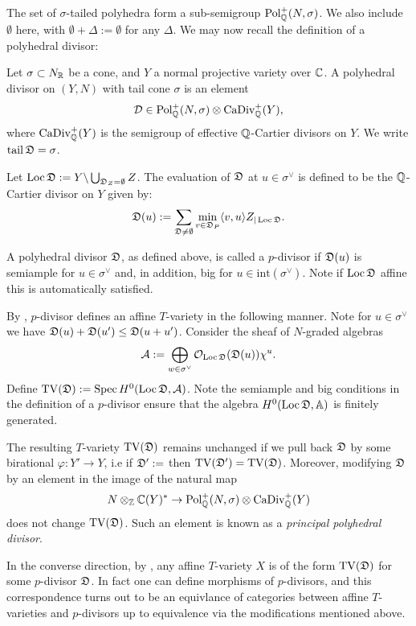 The set of \(\sigma\)-tailed polyhedra form a sub-semigroup \(\operatorname{Pol}_{\mathbb{Q}}^+(N,\sigma)\). We also include \(\emptyset\) here, with \(\emptyset + \Delta := \emptyset\) for any \(\Delta\). We may now recall the definition of a polyhedral divisor:
\begin{definition}
Let \(\sigma \subset N_{\mathbb{R}}\) be a cone, and \(Y\) a normal projective variety over \(\mathbb{C}\). A polyhedral divisor on \((Y,N)\) with tail cone \(\sigma\) is an element
\[
\mathcal{D} \in \operatorname{Pol}_{\mathbb{Q}}^+(N,\sigma) \otimes \operatorname{CaDiv}_{\mathbb{Q}}^+(Y),
\]
where \(\operatorname{CaDiv}_{\mathbb{Q}}^+(Y)\) is the semigroup of effective \(\mathbb{Q}\)-Cartier divisors on \(Y\). We write \(\operatorname{tail} {\mathfrak{D}} = \sigma\).
\end{definition}
Let \(\operatorname{Loc} {\mathfrak{D}} := Y \backslash \bigcup_{{\mathfrak{D}}_Z = \emptyset} Z\). The evaluation of \({\mathfrak{D}}\) at \(u \in \sigma^\vee\) is defined to be the \(\mathbb{Q}\)-Cartier divisor on \(Y\) given by:
\[
{\mathfrak{D}}(u) :=  \sum_{{\mathfrak{D}} \neq \emptyset} \min_{v \in {\mathfrak{D}}_P} \langle v,u \rangle Z_{|\operatorname{Loc} {\mathfrak{D}}}.
\]
\begin{definition}
A polyhedral divisor \({\mathfrak{D}}\), as defined above, is called a \(p\)-divisor if \({\mathfrak{D}}(u)\) is semiample for \(u \in \sigma^\vee\) and, in addition, big for \(u \in \text{int}(\sigma^\vee)\). Note if \(\operatorname{Loc} {\mathfrak{D}}\) affine this is automatically satisfied.
\end{definition}

By \cite[Proposition 3.1]{hausen2018torus}, \(p\)-divisor defines an affine \(T\)-variety in the following manner. Note for \(u \in \sigma^\vee\) we have \({\mathfrak{D}}(u) + {\mathfrak{D}}(u') \le {\mathfrak{D}}(u+u')\). Consider the sheaf of \(N\)-graded algebras
\[
\mathcal{A} := \bigoplus_{w \in \sigma^{\vee}} \mathcal{O}_{\operatorname{Loc} {\mathfrak{D}}} ({\mathfrak{D}}(u)) \chi^u.
\]
Define \(\operatorname{TV}({\mathfrak{D}}) := \operatorname{Spec} H^0(\operatorname{Loc} {\mathfrak{D}}, \mathcal{A}) \). Note the semiample and big conditions in the definition of a \(p\)-divisor ensure that the algebra \(H^0(\operatorname{Loc} {\mathfrak{D}}, \mathbb{A})\) is finitely generated.

The resulting \(T\)-variety \(\operatorname{TV}({\mathfrak{D}})\) remains unchanged if we pull back \({\mathfrak{D}}\) by some birational \(\varphi: Y' \to Y\), i.e if \({\mathfrak{D}}' := \) then \(\operatorname{TV}({\mathfrak{D}}') = \operatorname{TV}({\mathfrak{D}})\). Moreover, modifying \({\mathfrak{D}}\) by an element in the image of the natural map
\[
N \otimes_{\mathbb{Z}} \mathbb{C}(Y)^* \to \operatorname{Pol}_{\mathbb{Q}}^+(N,\sigma) \otimes \operatorname{CaDiv}_{\mathbb{Q}}^+(Y)
\]
does not change \(\operatorname{TV}({\mathfrak{D}})\). Such an element is known as a \textit{principal polyhedral divisor}.

In the converse direction, by \cite[Proposition 3.4]{hausen2018torus}, any affine \(T\)-variety \(X\) is of the form \(\operatorname{TV}({\mathfrak{D}})\) for some \(p\)-divisor \({\mathfrak{D}}\). In fact one can define morphisms of \(p\)-divisors, and this correspondence turns out to be an equivlance of categories between affine \(T\)-varieties and \(p\)-divisors up to equivalence via the modifications mentioned above.

